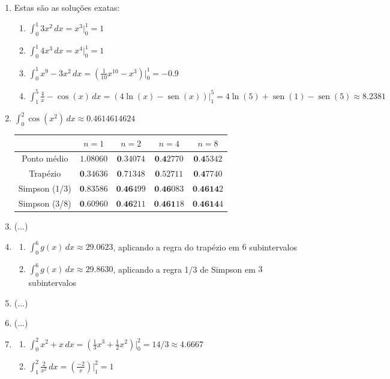 \documentclass[12pt,a4paper]{article}
\newcommand{\fixme}{{\color{red}(...)}}
\newcommand*\sen{\operatorname{sen}}
\begin{document}
\begin{enumerate}
\item Estas são as soluções exatas:
\begin{enumerate}
\item $\int_0^1 3x^2 \,dx = x^3 \Big|_0^1 = 1$
\item $\int_0^1 4x^3 \,dx = x^4 \Big|_0^1 = 1$
\item $\int_0^1 x^9 - 3x^2 \,dx= \left(\frac{1}{10}x^{10} - x^3\right) \Big|_0^1 = -0.9$
\item $\int_1^5 \frac{4}{x} - \cos(x) \,dx = \left( 4\ln(x) - \sen(x)\right) \Big|_1^5 = 4\ln(5) + \sen(1) - \sen(5) \approx 8.2381$
\end{enumerate}
\item $\int_0^2 \cos(x^2)\, dx \approx 0.4614614624$
\begin{center}
\begin{tabular}{|c|c|c|c|c|}
\hline
              & $n=1$     & $n=2$    & $n=4$   & $n=8$ \\ \hline
Ponto médio   & $1.08060$ & $\textbf{0}.34074$ & $\textbf{0.4}2770$ & $\textbf{0.4}5342$ \\ \hline
Trapézio      & $\textbf{0}.34636$ & $\textbf{0}.71348$ & $\textbf{0}.52711$ & $\textbf{0.4}7740$ \\ \hline
Simpson (1/3) & $\textbf{0}.83586$ & $\textbf{0.46}499$ & $\textbf{0.46}083$ & $\textbf{0.4614}2$ \\ \hline
Simpson (3/8) & $\textbf{0}.60960$ & $\textbf{0.46}211$ & $\textbf{0.461}18$ & $\textbf{0.4614}4$ \\ \hline
\end{tabular}
\end{center}
\item \fixme
\item
\begin{enumerate}
\item $\int_0^6 g(x)\,dx \approx 29.0623$, aplicando a regra do trapézio em $6$ subintervalos
\item $\int_0^6 g(x)\,dx \approx 29.8630$, aplicando a regra 1/3 de Simpson em $3$ subintervalos
\end{enumerate}
\item \fixme
\item \fixme
\item
\begin{enumerate}
\item $\int_0^2 x^2 + x\,dx = \left( \frac{1}{3}x^3 +\frac{1}{2}x^2 \right)\Big|_0^2 = 14/3 \approx 4.6667$
\item $\int_1^2 \frac{2}{x^2}\,dx = \left( \frac{-2}{x} \right)\Big|_1^2 = 1$

\end{enumerate}
\end{enumerate}
\end{document}
